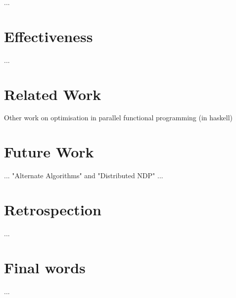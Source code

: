 
  ...
  \section{Effectiveness}
    ...
  \section{Related Work}
    Other work on optimisation in parallel functional programming (in haskell)
  \section{Future Work}
    ...
    "Alternate Algorithms" and "Distributed NDP"
      ...
  \section{Retrospection}
    ...
  \section{Final words}
    ...
    
